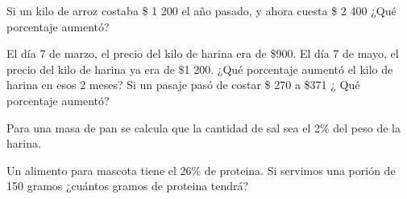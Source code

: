 \documentclass[12pt]{exam}
\begin{document}
\begin{questions}
        \question Si un kilo de arroz costaba \$ 1 200 el año pasado, y ahora cuesta \$ 2 400 ¿Qué porcentaje aumentó?
        
        \question El día 7 de marzo, el precio del kilo de harina era de \$900. El día 7 de mayo, el precio del kilo de harina ya era de \$1 200. 
                  ¿Qué porcentaje aumentó el kilo de harina en esos 2 meses?
        \question Si un pasaje pasó de costar \$ 270 a \$371 ¿ Qué porcentaje aumentó?
        
        \question Para una masa de pan se calcula que la cantidad de sal sea el 2\% del peso de la harina. 
        
        \question Un alimento para mascota tiene el 26\% de proteina. 
                 Si servimos una porión de 150 gramos ¿cuántos gramos de proteina tendrá?
    

\end{questions}
\end{document}
